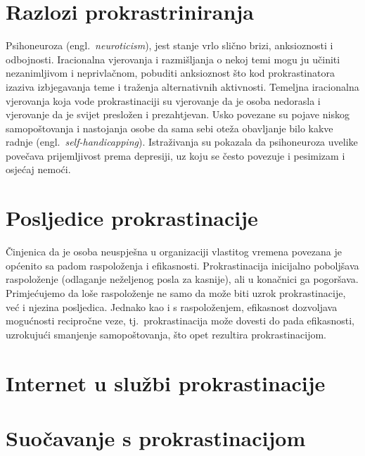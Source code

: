 \documentclass[11pt,twocolumn,english]{article}
\newcommand{\engl}[1]{(engl.~\emph{#1})}
\begin{document}
\section{Razlozi prokrastriniranja}

Psihoneuroza \engl{neuroticism}, jest stanje vrlo slično brizi,
anksioznosti i odbojnosti. Iracionalna vjerovanja i razmišljanja o nekoj temi
mogu ju učiniti nezanimljivom i neprivlačnom, pobuditi anksioznost što kod
prokrastinatora izaziva izbjegavanja teme i traženja alternativnih aktivnosti.
Temeljna iracionalna vjerovanja koja vode prokrastinaciji su vjerovanje da je
osoba nedorasla i vjerovanje da je svijet presložen i prezahtjevan. Usko
povezane su pojave niskog samopoštovanja i nastojanja osobe da sama sebi oteža
obavljanje bilo kakve radnje \engl{self-handicapping}. Istraživanja
\cite{Caballero95neuro, Saklofske95neuro} su pokazala da psihoneuroza uvelike
povečava prijemljivost prema depresiji, uz koju se često povezuje i pesimizam i
osjećaj nemoći.

\section{Posljedice prokrastinacije}
Činjenica da je osoba neuspješna u organizaciji vlastitog vremena povezana je
općenito sa padom raspoloženja i efikasnosti. Prokrastinacija inicijalno
poboljšava raspoloženje (odlaganje neželjenog posla za kasnije), ali u
konačnici ga pogoršava. Primjećujemo da loše raspoloženje ne samo da može biti
uzrok prokrastinacije, već i njezina posljedica. Jednako kao i s raspoloženjem,
efikasnost dozvoljava mogućnosti recipročne veze, tj.~prokrastinacija može
dovesti do pada efikasnosti, uzrokujući smanjenje samopoštovanja, što opet
rezultira prokrastinacijom.

\section{Internet u službi prokrastinacije}

\section{Suočavanje s prokrastinacijom}

\end{document}

